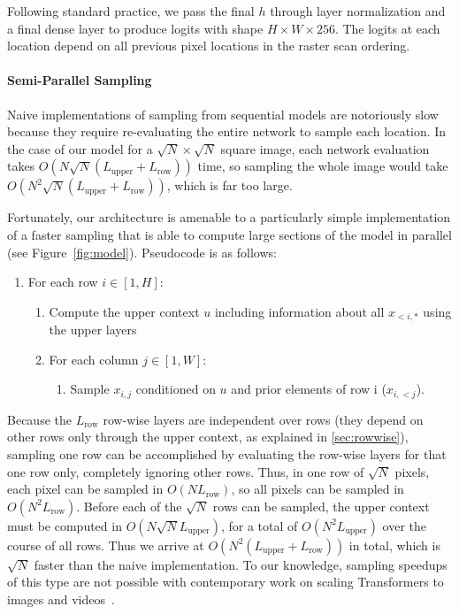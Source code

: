\documentclass{article} \usepackage{iclr2020_conference,times}
\begin{document}
Following standard practice, we pass the final $h$ through layer normalization and a final dense layer to produce logits with shape $H \times W \times 256$. The logits at each location depend on all previous pixel locations in the raster scan ordering.


\vspace{-0.5em}
\paragraph{Semi-Parallel Sampling}
\label{sec:sampling}

Naive implementations of sampling from sequential models are notoriously slow because they require re-evaluating the entire network to sample each location. In the case of our model for a ${\sqrt{N} \times \sqrt{N}}$ square image, each network evaluation takes $O(N \sqrt{N} (L_\text{upper} + L_\text{row}))$ time, so sampling the whole image would take $O(N^2 \sqrt{N} (L_\text{upper} + L_\text{row}))$, which is far too large.

Fortunately, our architecture is amenable to a particularly simple implementation of a faster sampling that is able to compute large sections of the model in parallel (see Figure~\ref{fig:model}). Pseudocode is as follows:
\begin{enumerate}
    \item For each row $i \in [1, H]$:
    \begin{enumerate}
        \item Compute the upper context $u$ including information about all $x_{<i,\ast}$ using the upper layers
        \item For each column $j \in [1, W]$:
        \begin{enumerate}
            \item Sample $x_{i,j}$ conditioned on $u$ and prior elements of row i ($x_{i,<j}$).
\end{enumerate}
    \end{enumerate}
\end{enumerate}
Because the $L_\text{row}$ row-wise layers are independent over rows (they depend on other rows only through the upper context, as explained in \cref{sec:rowwise}), sampling one row can be accomplished by evaluating the row-wise layers for that one row only, completely ignoring other rows. Thus, in one row of $\sqrt{N}$ pixels, each pixel can be sampled in $O(N L_\text{row})$, so all pixels can be sampled in $O(N^2 L_\text{row})$. Before each of the $\sqrt{N}$ rows can be sampled, the upper context must be computed in $O(N \sqrt{N} L_\text{upper})$, for a total of  $O(N^2 L_\text{upper})$ over the course of all rows. Thus we arrive at $O(N^2 ( L_\text{upper} + L_\text{row}))$ in total, which is $\sqrt{N}$ faster than the naive implementation. To our knowledge, sampling speedups of this type are not possible with contemporary work on scaling Transformers to images and videos~\citep{child2019generating,weissenborn2019scaling}.
\end{document}
